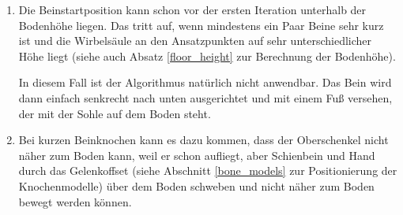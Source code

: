\begin{enumerate}
 \item %
   Die Beinstartposition kann schon vor der ersten Iteration unterhalb der Bodenhöhe liegen. Das tritt auf, wenn mindestens ein Paar Beine sehr kurz ist und die Wirbelsäule an den Ansatzpunkten auf sehr unterschiedlicher Höhe liegt (siehe auch Absatz \ref{floor_height} zur Berechnung der Bodenhöhe).
   
   In diesem Fall ist der Algorithmus natürlich nicht anwendbar. Das Bein wird dann einfach senkrecht nach unten ausgerichtet und mit einem Fuß versehen, der mit der Sohle auf dem Boden steht.
   
 \item %
   Bei kurzen Beinknochen kann es dazu kommen, dass der Oberschenkel nicht näher zum Boden kann, weil er schon aufliegt, aber Schienbein und Hand durch das Gelenkoffset (siehe Abschnitt \ref{bone_models} zur Positionierung der Knochenmodelle) über dem Boden schweben und nicht näher zum Boden bewegt werden können.
\end{enumerate}







